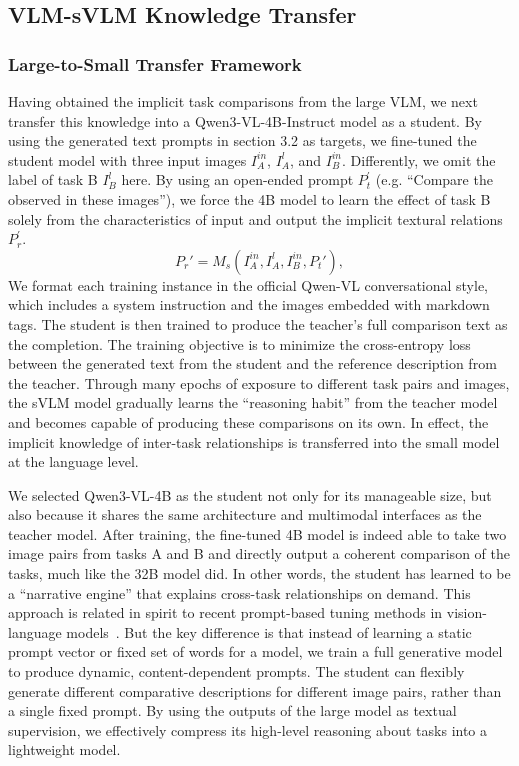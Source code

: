 \subsection{VLM-sVLM Knowledge Transfer}

\subsubsection{Large-to-Small Transfer Framework}

Having obtained the implicit task comparisons from the large VLM, we next transfer this knowledge into a Qwen3-VL-4B-Instruct model as a student. By using the generated text prompts in section 3.2 as targets, we fine-tuned the student model with three input images $I_A^{in}$, $I_A^{l}$, and $I_B^{in}$. Differently, we omit the label of task B $I_B^{l}$ here. By using an open-ended prompt $P_t^{'}$ (e.g. ``Compare the observed in these images''), we force the 4B model to learn the effect of task B solely from the characteristics of input and output the implicit textural relations $P_r^{'}$.
\begin{equation}
P_r' = M_s(I_A^{in}, I_A^{l}, I_B^{in}, P_t'),
\end{equation}
We format each training instance in the official Qwen-VL conversational style, which includes a system instruction and the images embedded with markdown tags. The student is then trained to produce the teacher's full comparison text as the completion. The training objective is to minimize the cross-entropy loss between the generated text from the student and the reference description from the teacher. Through many epochs of exposure to different task pairs and images, the sVLM model gradually learns the ``reasoning habit'' from the teacher model and becomes capable of producing these comparisons on its own. In effect, the implicit knowledge of inter-task relationships is transferred into the small model at the language level.

We selected Qwen3-VL-4B as the student not only for its manageable size, but also because it shares the same architecture and multimodal interfaces as the teacher model. After training, the fine-tuned 4B model is indeed able to take two image pairs from tasks A and B and directly output a coherent comparison of the tasks, much like the 32B model did. In other words, the student has learned to be a ``narrative engine'' that explains cross-task relationships on demand. This approach is related in spirit to recent prompt-based tuning methods in vision-language models~\cite{zhou2022coop}. But the key difference is that instead of learning a static prompt vector or fixed set of words for a model, we train a full generative model to produce dynamic, content-dependent prompts. The student can flexibly generate different comparative descriptions for different image pairs, rather than a single fixed prompt. By using the outputs of the large model as textual supervision, we effectively compress its high-level reasoning about tasks into a lightweight model.


